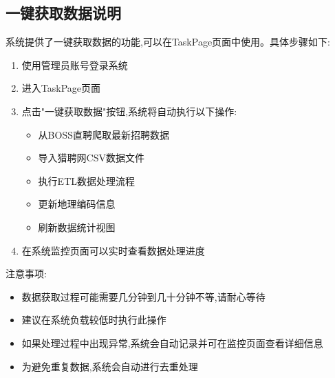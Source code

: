\subsection{一键获取数据说明}

系统提供了一键获取数据的功能,可以在TaskPage页面中使用。具体步骤如下:

\begin{enumerate}
    \item 使用管理员账号登录系统
    \item 进入TaskPage页面
    \item 点击"一键获取数据"按钮,系统将自动执行以下操作:
    \begin{itemize}
        \item 从BOSS直聘爬取最新招聘数据
        \item 导入猎聘网CSV数据文件
        \item 执行ETL数据处理流程
        \item 更新地理编码信息
        \item 刷新数据统计视图
    \end{itemize}
    \item 在系统监控页面可以实时查看数据处理进度
\end{enumerate}

注意事项:
\begin{itemize}
    \item 数据获取过程可能需要几分钟到几十分钟不等,请耐心等待
    \item 建议在系统负载较低时执行此操作
    \item 如果处理过程中出现异常,系统会自动记录并可在监控页面查看详细信息
    \item 为避免重复数据,系统会自动进行去重处理
\end{itemize}
